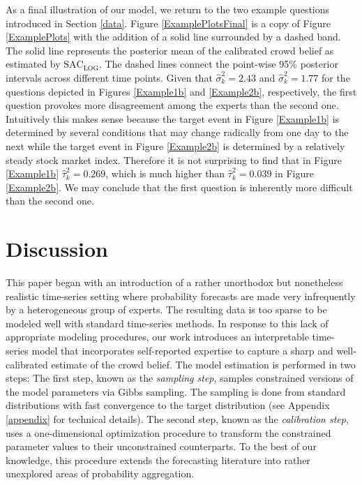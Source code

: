 \documentclass[aoas, preprint]{imsart}
\numberwithin{equation}{section}
\theoremstyle{plain}
\begin{document}
As a final illustration of our model, we return to the two example questions introduced in Section \ref{data}. Figure \ref{ExamplePlotsFinal} is a copy of Figure \ref{ExamplePlots} with the addition of a solid line surrounded by a dashed band. The solid line represents the posterior mean of the calibrated crowd belief as estimated by $\text{SAC}_{\text{LOG}}$. The dashed lines connect the point-wise 95\% posterior intervals across different time points. Given that $\hat{\sigma}_k^2 = 2.43$  and $\hat{\sigma}_k^2 = 1.77$ for the questions depicted in Figures \ref{Example1b} and \ref{Example2b}, respectively, the first question provokes more disagreement among the experts than the second one. Intuitively this makes sense because the target event in Figure \ref{Example1b}  is determined by several conditions that may change radically from one day to the next while the target event in Figure \ref{Example2b} is determined by a relatively steady stock market index. Therefore it is not surprising to find that in Figure \ref{Example1b} $\hat{\tau}_k^2 = 0.269$, which is much higher than $\hat{\tau}_k^2 = 0.039$ in Figure \ref{Example2b}. We may conclude that the first question is inherently more difficult than the second one. 


\section{Discussion}
This paper began with an introduction of a rather unorthodox but nonetheless realistic time-series setting where probability forecasts are made very infrequently by a heterogeneous group of experts. The resulting data is too sparse to be modeled well with standard time-series methods.  In response to this lack of appropriate modeling procedures, our work introduces an interpretable time-series model that incorporates self-reported expertise to capture a sharp and well-calibrated estimate of the crowd belief. The model estimation is performed in two steps: The first step, known as the \textit{sampling step}, samples constrained versions of the model parameters via Gibbs sampling. The sampling is done from standard distributions with fast convergence to the target distribution (see Appendix \ref{appendix} for technical details). The second step, known as the \textit{calibration step}, uses a one-dimensional optimization procedure to transform the constrained parameter values to their unconstrained counterparts. To the best of our knowledge, this procedure extends the forecasting literature into rather unexplored areas of probability aggregation.
\end{document}
